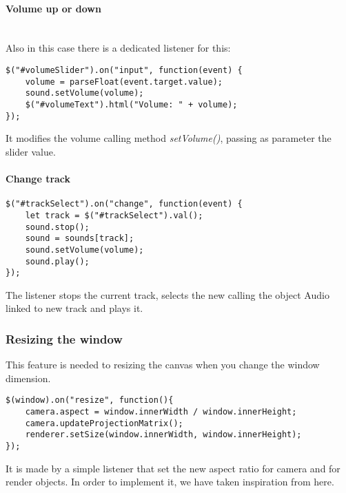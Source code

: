 \documentclass{article}
\begin{document}
\paragraph{Volume up or down} \mbox{}\\
Also in this case there is a dedicated listener for this:
\begin{lstlisting}
$("#volumeSlider").on("input", function(event) {
	volume = parseFloat(event.target.value);
	sound.setVolume(volume);
	$("#volumeText").html("Volume: " + volume);
});
\end{lstlisting}
It modifies the volume calling method \textit{setVolume()}, passing as parameter the slider value.
\paragraph{Change track} \mbox{}
\begin{lstlisting}
$("#trackSelect").on("change", function(event) {
	let track = $("#trackSelect").val();
	sound.stop();
	sound = sounds[track];
	sound.setVolume(volume);
	sound.play();
});
\end{lstlisting}
The listener stops the current track, selects the new calling the object Audio linked to new track and plays it. 

\subsubsection{Resizing the window}
This feature is needed to resizing the canvas when you change the window dimension. 
\begin{lstlisting}
$(window).on("resize", function(){
	camera.aspect = window.innerWidth / window.innerHeight;
	camera.updateProjectionMatrix();
	renderer.setSize(window.innerWidth, window.innerHeight);
});
\end{lstlisting}
It is made by a simple listener that set the new aspect ratio for camera and for render objects. In order to implement it, we have taken inspiration from here\cite{resizing:stackoverflow}.
\end{document}

